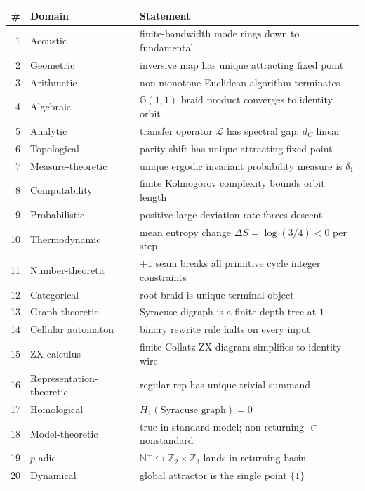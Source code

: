 \documentclass[11pt,a4paper]{article}
\theoremstyle{plain}
\theoremstyle{definition}
\theoremstyle{remark}
\numberwithin{equation}{section}
\newcommand{\Cl}{\mathbb{G}}
\newcommand{\Nat}{\mathbb{N}}
\newcommand{\Z}{\mathbb{Z}}
\newcommand{\Lcal}{\mathcal{L}}
\begin{document}
\begin{table}[h]
\centering
\begin{tabular}{@{}rll@{}}
\hline
\# & Domain & Statement\\
\hline
1  & Acoustic                & finite-bandwidth mode rings down to fundamental\\
2  & Geometric               & inversive map has unique attracting fixed point\\
3  & Arithmetic              & non-monotone Euclidean algorithm terminates\\
4  & Algebraic               & $\Cl(1,1)$ braid product converges to identity orbit\\
5  & Analytic                & transfer operator $\Lcal$ has spectral gap; $d_C$ linear\\
6  & Topological             & parity shift has unique attracting fixed point\\
7  & Measure-theoretic       & unique ergodic invariant probability measure is $\delta_1$\\
8  & Computability           & finite Kolmogorov complexity bounds orbit length\\
9  & Probabilistic           & positive large-deviation rate forces descent\\
10 & Thermodynamic           & mean entropy change $\Delta S=\log(3/4)<0$ per step\\
11 & Number-theoretic        & $+1$ seam breaks all primitive cycle integer constraints\\
12 & Categorical             & root braid is unique terminal object\\
13 & Graph-theoretic         & Syracuse digraph is a finite-depth tree at $1$\\
14 & Cellular automaton      & binary rewrite rule halts on every input\\
15 & ZX calculus             & finite Collatz ZX diagram simplifies to identity wire\\
16 & Representation-theoretic& regular rep has unique trivial summand\\
17 & Homological             & $H_1(\text{Syracuse graph})=0$\\
18 & Model-theoretic         & true in standard model; non-returning $\subset$ nonstandard\\
19 & $p$-adic                & $\Nat^+\hookrightarrow\Z_2\times\Z_3$ lands in returning basin\\
20 & Dynamical               & global attractor is the single point $\{1\}$\\

\end{tabular}
\end{table}
\end{document}
